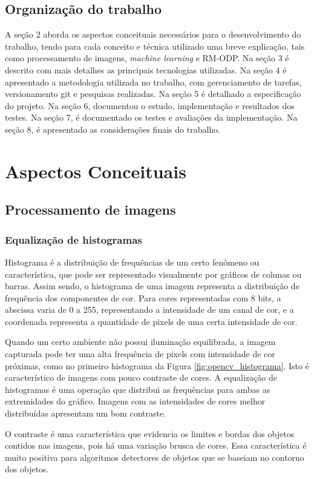 \documentclass[]{politex}
\begin{document}
\section{Organização do trabalho}
A seção 2 aborda os aspectos conceituais necessários para o desenvolvimento do trabalho, tendo para cada conceito e técnica utilizado uma breve explicação, tais como processamento de imagens, \textit{machine learning} e  RM-ODP. Na seção 3 é descrito com mais detalhes as principais tecnologias utilizadas. Na seção 4 é apresentado a metodologia utilizada no trabalho, com gerenciamento de tarefas, versionamento git e pesquisas realizadas. Na seção 5 é detalhado a especificação do projeto. Na seção 6, documentou o estudo, implementação e resultados dos testes. Na seção 7, é documentado os testes e avaliações da implementação. Na seção 8, é apresentado as considerações finais do trabalho.

\chapter{Aspectos Conceituais}

\section{Processamento de imagens}
\subsection{Equalização de histogramas} \label{histogramas}
Histograma é a distribuição de frequências de um certo fenômeno ou característica, que pode ser representado visualmente por gráficos de colunas ou barras. Assim sendo, o histograma de uma imagem representa a distribuição de frequência dos componentes de cor. Para cores representadas com 8 bits, a abscissa varia de 0 a 255, representando a intensidade de um canal de cor, e a coordenada representa a quantidade de pixels de uma certa intensidade de cor.

Quando um certo ambiente não possui iluminação equilibrada, a imagem capturada pode ter uma alta frequência de pixels com intensidade de cor próximas, como no primeiro histograma da Figura \ref{fig:opencv_histograma}. Isto é característico de imagens com pouco contraste de cores. A equalização de histogramas é uma operação que distribui as frequências para ambas as extremidades do gráfico. Imagens com as intensidades de cores melhor distribuídas apresentam um bom contraste.

O contraste é uma característica que evidencia os limites e bordas dos objetos contidos nas imagens, pois há uma variação brusca de cores. Essa característica é muito positiva para algoritmos detectores de objetos que se baseiam no contorno dos objetos.
\end{document}
